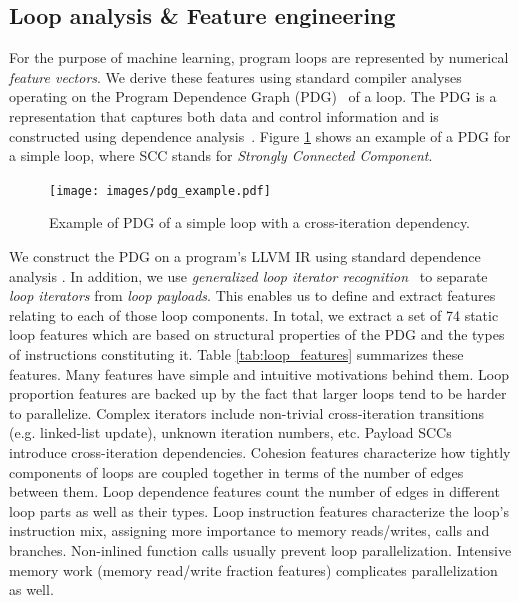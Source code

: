 \subsection{Loop analysis \& Feature engineering}
\label{loop_analysis_and_features}
\quad For the purpose of machine learning, program loops are represented by numerical \textit{feature vectors}. We derive these features using standard compiler analyses operating on the Program Dependence Graph (PDG)~\cite{Ferrante:1987:PDG:24039.24041} of a loop. The PDG is a representation that captures both data and control information and is constructed using dependence analysis~\cite{Kennedy:2001:OCM:502981}. Figure \ref{fig:pdg} shows an example of a PDG for a simple loop, where SCC stands for \emph{Strongly Connected Component}.
\begin{figure}[ht]
\texttt{[image: images/pdg\_example.pdf]}
\caption{Example of PDG of a simple loop with a cross-iteration dependency.}
\label{fig:pdg}
\end{figure}
We construct the PDG on a program's LLVM IR using standard dependence analysis \cite{Kennedy:2001:OCM:502981}. In addition, we use \textit{generalized loop iterator recognition}~\cite{Manilov:2018:GPI:3178372.3179511} to separate \textit{loop iterators} from \textit{loop payloads}. This enables us to define and extract features relating to each of those loop components. In total, we extract a set of 74 static loop features which are based on structural properties of the PDG and the types of instructions constituting it. Table \ref{tab:loop_features} summarizes these features.\newline\null
\quad Many features have simple and intuitive motivations behind them. Loop proportion features are backed up by the fact that larger loops tend to be harder to parallelize. Complex iterators include non-trivial cross-iteration transitions (e.g. linked-list update), unknown iteration numbers, etc. Payload SCCs introduce cross-iteration dependencies. Cohesion features characterize how tightly components of loops are coupled together in terms of the number of edges between them. Loop dependence features count the number of edges in different loop parts as well as their types. Loop instruction features characterize the loop's instruction mix, assigning more importance to memory reads/writes, calls and branches. Non-inlined function calls usually prevent loop parallelization. Intensive memory work (memory read/write fraction features) complicates parallelization as well.
